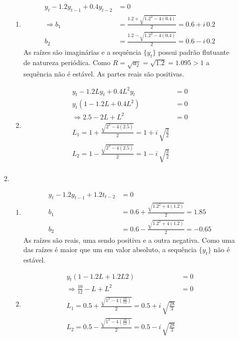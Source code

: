 \begin{enumerate}
\begin{enumerate}
		\begin{enumerate}
			\item %
		
		\begin{align*}
				y_t-1.2y_{t-1}+0.4y_{t-2}&=0\\
				\Rightarrow b_1&=\frac{1.2+\sqrt{1.2^2-4(0.4)}}{2}=0.6+i\,0.2\\
				b_2&=\frac{1.2-\sqrt{1.2^2-4(0.4)}}{2}=0.6-i\,0.2
			\end{align*}
		As raízes são imaginárias e a sequência $\{y_t\}$ possui padrão flutuante de natureza periódica. Como $R=\sqrt{a_2}=\sqrt{1.2}=1.095>1$ a sequência não é estável. As partes reais são positivas.
		
		\item %
		
		\begin{align*}
			y_t-1.2Ly_t+0.4L^2y_t&=0\\
			y_t(1-1.2L+0.4L^2)&=0\\
			\Rightarrow 2.5-2L+L^2&=0\\
			L_1=1+\frac{\sqrt{2^2-4(2.5)}}{2}=1+i\,\sqrt{\frac{3}{2}}\\
			L_2=1-\frac{\sqrt{2^2-4(2.5)}}{2}=1-i\,\sqrt{\frac{3}{2}}\\
		\end{align*}
		
	\end{enumerate}
		
		\item %
		
		\begin{enumerate}
			\item %
		
		\begin{align*}
			y_t-1.2y_{t-1}+1.2t_{t-2}&=0\\
			b_1&=0.6+\frac{\sqrt{1.2^2+4(1.2)}}{2}=1.85\\
			b_2&=0.6-\frac{\sqrt{1.2^2+4(1.2)}}{2}=-0.65
			\end{align*}
		As raízes são reais, uma sendo positiva e a outra negativa. Como uma das raízes é maior que um em valor absoluto, a sequência $\{y_t\}$ não é estável.
		
		\item %
		\begin{align*}
			y_t(1-1.2L+1.2L2)&=0\\
			\Rightarrow \frac{10}{12}-L+L^2&=0\\
			L_1=0.5+\frac{\sqrt{1^2-4(\frac{10}{12})}}{2}=0.5+i\,\sqrt{\frac{28}{3}}\\
			L_2=0.5-\frac{\sqrt{1^2-4(\frac{10}{12})}}{2}=0.5-i\,\sqrt{\frac{28}{3}}
		\end{align*}
		

\end{enumerate}
\end{enumerate}
\end{enumerate}
